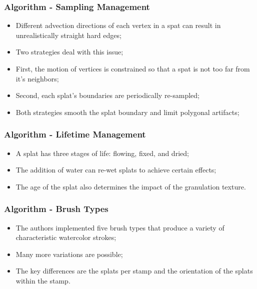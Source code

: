 \documentclass{beamer}
\begin{document}
\begin{frame}
    \frametitle{Algorithm - Sampling Management}
    \begin{itemize}
        \item Different advection directions of each vertex in a spat can
        result in unrealistically straight hard edges;
        \item Two strategies deal with this issue;
        \item First, the motion of vertices is constrained so that a spat
        is not too far from it's neighbors;
        \item Second, each splat's boundaries are periodically re-sampled;
        \item Both strategies smooth the splat boundary and limit polygonal
        artifacts;
    \end{itemize}
\end{frame}

\begin{frame}
    \frametitle{Algorithm - Lifetime Management}
    \begin{itemize}
        \item A splat has three stages of life: flowing, fixed, and dried;
        \item The addition of water can re-wet splats to achieve certain
        effects;
        \item The age of the splat also determines the impact of the
        granulation texture.
    \end{itemize}
\end{frame}

\begin{frame}
    \frametitle{Algorithm - Brush Types}
    \begin{itemize}
        \item The authors implemented five brush types that produce a variety
        of characteristic watercolor strokes;
        \item Many more variations are possible;
        \item The key differences are the splats per stamp and the orientation
        of the splats within the stamp.
    \end{itemize}
\end{frame}
\end{document}
